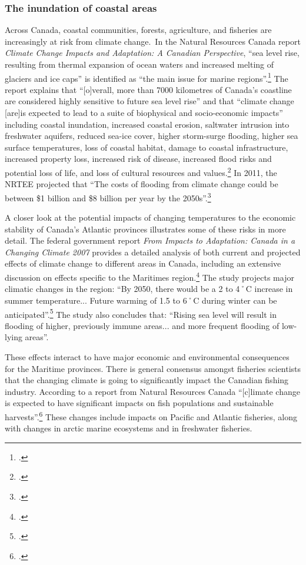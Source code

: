 	\subsubsection{The inundation of coastal areas}
	
	
	
Across Canada, coastal communities, forests, agriculture, and fisheries are increasingly at risk from climate change.\
In the Natural Resources Canada report \emph{Climate Change Impacts and Adaptation: A Canadian Perspective}, ``sea level rise, resulting from thermal expansion of ocean waters and increased melting of glaciers and ice caps'' is identified as ``the main issue for marine regions''.\footcite[][p. xvi]{Lemmen2010}
The report explains that ``[o]verall, more than 7000 kilometres of Canada's coastline are considered highly sensitive to future sea level rise'' and that ``climate change [are]is expected to lead to a suite of biophysical and socio-economic impacts'' including coastal inundation, increased coastal erosion, saltwater intrusion into freshwater aquifers, reduced sea-ice cover, higher storm-surge flooding, higher sea surface temperatures, loss of coastal habitat, damage to coastal infrastructure, increased property loss, increased risk of disease, increased flood risks and potential loss of life, and loss of cultural resources and values.\footcite[][p. xvii]{Lemmen2010}
In 2011, the NRTEE projected that ``The costs of flooding from climate change could be between \$1 billion and \$8 billion per year by the 2050s''.\footcite[][p.16]{NRTEEPrice}


A closer look at the potential impacts of changing temperatures to the economic stability of Canada's Atlantic provinces illustrates some of these risks in more detail. 
The federal government report \emph{From Impacts to Adaptation: Canada in a Changing Climate 2007} provides a detailed analysis of both current and projected effects of climate change to different areas in Canada, including an extensive discussion on effects specific to the Maritimes region.\footcite[][]{ImpToAda}
The study projects major climatic changes in the region: ``By 2050, there would be a 2 to 4˚C increase in summer temperature... Future warming of 1.5 to 6˚C during winter can be anticipated''.\footcite[][p.131]{ImpToAda}
The study also concludes that: ``Rising sea level will result in flooding of higher, previously immune areas... and more frequent flooding of low-lying areas''.


These effects interact to have major economic and environmental consequences for the Maritime provinces.  
There is general consensus amongst fisheries scientists that the changing climate is going to significantly impact the Canadian fishing industry.
According to a report from Natural Resources Canada ``[c]limate change is expected to have significant impacts on fish populations and sustainable harvests''.\footcite[][p. xv]{NRCANImpactsAdapt}
These changes include impacts on Pacific and Atlantic fisheries, along with changes in arctic marine ecosystems and in freshwater fisheries.



